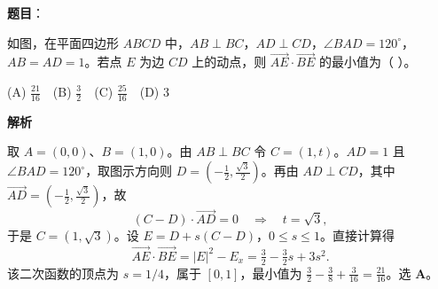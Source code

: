 \begin{answer}

\textbf{题目}：

如图，在平面四边形 $ABCD$ 中，$AB\perp BC$，$AD\perp CD$，$\angle BAD=120^\circ$，$AB=AD=1$。若点 $E$ 为边 $CD$ 上的动点，则 $\overrightarrow{AE}\cdot\overrightarrow{BE}$ 的最小值为（ ）。
\nopagebreak[4]
\begin{center}\end{center}
\nopagebreak[4]
(A) $\frac{21}{16}$　(B) $\frac32$　(C) $\frac{25}{16}$　(D) $3$

\textbf{解析}

取 $A=(0,0)$、$B=(1,0)$。由 $AB\perp BC$ 令 $C=(1,t)$。$AD=1$ 且 $\angle BAD=120^\circ$，取图示方向则 $D=(-\tfrac12,\tfrac{\sqrt3}2)$。再由 $AD\perp CD$，其中 $\overrightarrow{AD}=(-\tfrac12,\tfrac{\sqrt3}2)$，故
\nopagebreak[4]
\[(C-D)\cdot\overrightarrow{AD}=0\quad\Longrightarrow\quad t=\sqrt3,\]
于是 $C=(1,\sqrt3)$。设 $E=D+s(C-D)$，$0\le s\le1$。直接计算得
\nopagebreak[4]
\[\overrightarrow{AE}\cdot\overrightarrow{BE}=|E|^2-E_x=\tfrac32-\tfrac32s+3s^2.\]
该二次函数的顶点为 $s=1/4$，属于 $[0,1]$，最小值为 $\tfrac32-\tfrac38+\tfrac3{16}=\tfrac{21}{16}$。选 \textbf{A}。


\end{answer}

